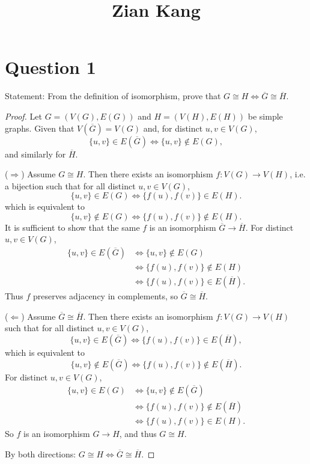 \documentclass[11pt]{article}
\title{\vspace{-2cm} Zian Kang}
\date{}
\begin{document}
\maketitle

\section*{Question 1}


Statement: From the definition of isomorphism, prove that $G\cong H \iff \overline{G}\cong \overline{H}$.

\medskip

\begin{proof}
Let $G=(V(G),E(G))$ and $H=(V(H),E(H))$ be simple graphs. Given that $V(\overline{G})=V(G)$ and, for distinct
$u,v\in V(G)$,
\[
\{u,v\}\in E(\overline{G}) \iff \{u,v\}\notin E(G),
\]
and similarly for $\overline{H}$.

\smallskip
\noindent ($\Rightarrow$) Assume $G\cong H$. Then there exists an isomorphism
$f:V(G)\to V(H)$, i.e. a bijection such that for all distinct $u,v\in V(G)$,
\[
\{u,v\}\in E(G)\iff \{f(u),f(v)\}\in E(H).
\]
which is equivalent to 
\[
\{u,v\}\notin E(G)\iff \{f(u),f(v)\}\notin E(H).
\]
It is sufficient to show that the same $f$ is an isomorphism $\overline{G}\to \overline{H}$.
For distinct $u,v\in V(G)$,
\begin{align*}
\{u,v\}\in E(\overline{G})
&\iff \{u,v\}\notin E(G)\\
&\iff \{f(u),f(v)\}\notin E(H)\\
&\iff \{f(u),f(v)\}\in E(\overline{H}).
\end{align*}
Thus $f$ preserves adjacency in complements, so $\overline{G}\cong \overline{H}$.

\smallskip
\noindent ($\Leftarrow$) Assume $\overline{G}\cong \overline{H}$. Then there exists
an isomorphism $f:V(G)\to V(H)$ such that for all distinct $u,v\in V(G)$,
\[
\{u,v\}\in E(\overline{G})\iff \{f(u),f(v)\}\in E(\overline{H}),
\]
which is equivalent to 
\[
\{u,v\}\notin E(\overline{G})\iff \{f(u),f(v)\}\notin E(\overline{H}).
\]
For distinct $u,v\in V(G)$,
\begin{align*}
\{u,v\}\in E(G)
&\iff \{u,v\}\notin E(\overline{G})\\
&\iff \{f(u),f(v)\}\notin E(\overline{H})\\
&\iff \{f(u),f(v)\}\in E(H).
\end{align*}
So $f$ is an isomorphism $G\to H$, and thus $G\cong H$.

\smallskip
By both directions: $G\cong H \iff \overline{G}\cong \overline{H}$.
\end{proof}
\end{document}
